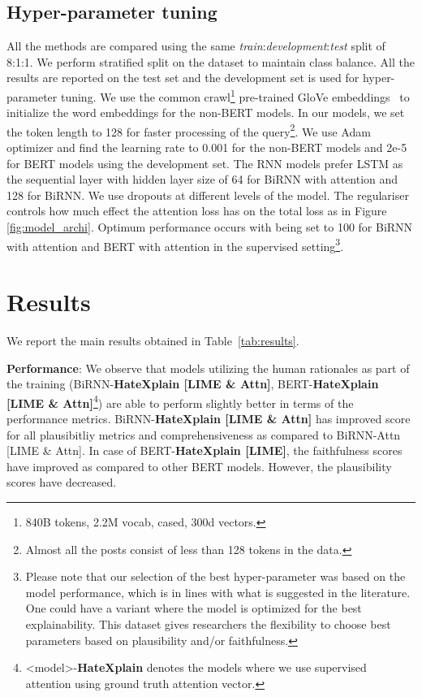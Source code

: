 \documentclass[letterpaper]{article} \usepackage{aaai21}  \usepackage{times}  \usepackage{helvet} \usepackage{courier}  \usepackage[hyphens]{url}  \usepackage{graphicx} \urlstyle{rm} \def\UrlFont{\rm}  \usepackage{natbib}  \usepackage{caption}
\begin{document}
\subsection{Hyper-parameter tuning}
All the methods are compared using the same \textit{train}:\textit{development}:\textit{test} split of 8:1:1. We perform stratified split on the dataset to maintain class balance. All the results are reported on the test set and the development set is used for hyper-parameter tuning.
We use the common crawl\footnote{840B tokens, 2.2M vocab, cased, 300d vectors.} pre-trained GloVe embeddings~\cite{pennington2014glove} to initialize the word embeddings for the non-BERT models. In our models, we set the token length to 128 for faster processing of the query\footnote{Almost all the posts consist of less than 128 tokens in the data.}. We use Adam~\cite{kingma2014adam} optimizer and find the learning rate to 0.001 for the non-BERT models and 2e-5 for BERT models using the development set. The RNN models prefer LSTM as the sequential layer with hidden layer size of 64 for BiRNN with attention and 128 for BiRNN.  We use dropouts at different levels of the model. The regulariser  controls how much effect the attention loss has on the total loss as in Figure \ref{fig:model_archi}. Optimum performance occurs with  being set to 100 for BiRNN with attention and BERT with attention in the supervised setting\footnote{Please note that our selection of the best hyper-parameter was based on the model performance, which is in lines with what is suggested in the literature. One could have a variant where the model is optimized for the best explainability. This dataset gives researchers the flexibility to choose best parameters based on plausibility and/or faithfulness.}.




\section{Results}
 We report the main results obtained in Table~\ref{tab:results}.

\noindent\textbf{Performance}: We observe that models  utilizing the human rationales as part of the training (BiRNN-{\bf{HateXplain} [LIME \& Attn]}, BERT-{\bf{HateXplain} [LIME \& Attn]}\footnote{\textless model\textgreater-{\bf{HateXplain}} denotes the models where we use supervised attention using ground truth attention vector.}) are able to perform slightly better in terms of the performance metrics. 
BiRNN-{\bf{HateXplain} [LIME \& Attn]} has improved score for all plausibitliy metrics and comprehensiveness as compared to BiRNN-Attn [LIME \& Attn]. In case of BERT-{\bf{HateXplain} [LIME]}, the faithfulness scores have improved as compared to other BERT models. However, the plausibility scores have decreased.
\end{document}
